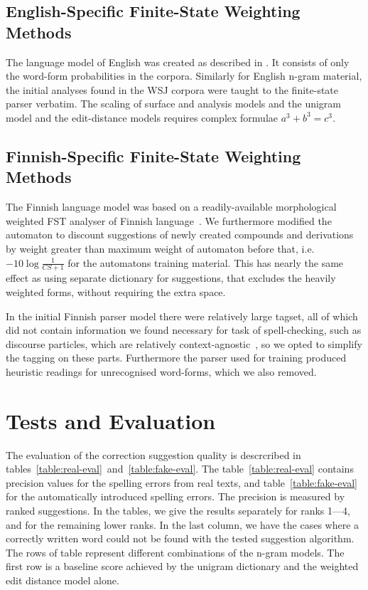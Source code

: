 \documentclass[11pt,a4paper]{article}
\begin{document}
\subsection{English-Specific Finite-State Weighting Methods}

The language model of English was created as described in \cite{norvig/2010}.
It consists of only the word-form probabilities in the corpora. Similarly for
English n-gram material, the initial analyses found in the WSJ corpora were
taught to the finite-state parser verbatim. The scaling of surface and analysis
models and the unigram model and the edit-distance models requires complex
formulae $a^3 + b^3 = c^3$.


\subsection{Finnish-Specific Finite-State Weighting Methods}

The Finnish language model was based on a readily-available morphological
weighted FST analyser of Finnish language~\cite{pirinen/2008}.  We furthermore
modified the automaton to discount suggestions of newly created compounds and
derivations by weight greater than maximum weight of automaton before that,
i.e. $-10\log\frac{1}{CS+1}$ for the automatons training material. This has
nearly the same effect as using separate dictionary for suggestions, that
excludes the heavily weighted forms, without requiring the extra space.

In the initial Finnish parser model there were relatively large tagset, all of
which did not contain information we found necessary for task of
spell-checking, such as discourse particles, which are relatively
context-agnostic~\cite{visk}, so we opted to simplify the tagging on these
parts. Furthermore the parser used for training produced heuristic readings for
unrecognised word-forms, which we also removed.

\section{Tests and Evaluation}
\label{sec:evaluation}

The evaluation of the correction suggestion quality is descrcribed in
tables~\ref{table:real-eval}~and~\ref{table:fake-eval}. The
table~\ref{table:real-eval} contains precision values for the spelling errors
from real texts, and table~\ref{table:fake-eval} for the automatically
introduced spelling errors. The precision is measured by ranked suggestions. In
the tables, we give the results separately for ranks 1---4, and for the
remaining lower ranks.  In the last column, we have the cases where a correctly
written word could not be found with the tested suggestion algorithm.  The rows
of table represent different combinations of the n-gram models. The first row
is a baseline score achieved by the unigram dictionary and the weighted edit
distance model alone.
\end{document}
